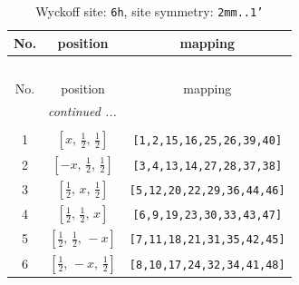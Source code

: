 \documentclass[fleqn,8pt]{jsarticle}
\begin{document}
\begin{longtable}{ccc}
\caption{Wyckoff site: {\tt 6h}, site symmetry: {\tt 2mm..1'}}
 \\
 \hline \hline
No. & position & mapping \\ \hline \endfirsthead

\multicolumn{2}{l}{\tablename\ \thetable{}} \\
 \hline \hline
No. & position & mapping \\ \hline \endhead

 \hline \hline
\multicolumn{2}{r}{\footnotesize\it continued ...} \\ \endfoot

 \hline \hline
\multicolumn{2}{r}{} \\ \endlastfoot

1 & $\left[ x,\, \frac{1}{2},\, \frac{1}{2} \right]$ & {\tt [1,2,15,16,25,26,39,40]} \\ \hline
2 & $\left[ - x,\, \frac{1}{2},\, \frac{1}{2} \right]$ & {\tt [3,4,13,14,27,28,37,38]} \\ \hline
3 & $\left[ \frac{1}{2},\, x,\, \frac{1}{2} \right]$ & {\tt [5,12,20,22,29,36,44,46]} \\ \hline
4 & $\left[ \frac{1}{2},\, \frac{1}{2},\, x \right]$ & {\tt [6,9,19,23,30,33,43,47]} \\ \hline
5 & $\left[ \frac{1}{2},\, \frac{1}{2},\, - x \right]$ & {\tt [7,11,18,21,31,35,42,45]} \\ \hline
6 & $\left[ \frac{1}{2},\, - x,\, \frac{1}{2} \right]$ & {\tt [8,10,17,24,32,34,41,48]} \\
\end{longtable}
\renewcommand{\arraystretch}{1.2}
\end{document}

